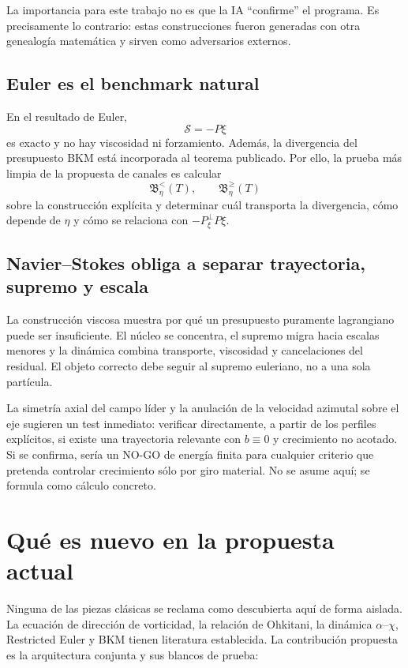 \documentclass[11pt]{article}
\newcommand{\Pperp}{P_{\xi}^{\perp}}
\newcommand{\Scal}{\mathcal S}
\begin{document}
La importancia para este trabajo no es que la IA ``confirme'' el programa. Es precisamente lo contrario: estas construcciones fueron generadas con otra genealogía matemática y sirven como adversarios externos.

\subsection{Euler es el benchmark natural}

En el resultado de Euler,
\[
\Scal=-P\xi
\]
es exacto y no hay viscosidad ni forzamiento. Además, la divergencia del presupuesto BKM está incorporada al teorema publicado. Por ello, la prueba más limpia de la propuesta de canales es calcular
\[
\mathfrak B_\eta^{<}(T),\qquad \mathfrak B_\eta^{\ge}(T)
\]
sobre la construcción explícita y determinar cuál transporta la divergencia, cómo depende de $\eta$ y cómo se relaciona con $-\Pperp P\xi$.

\subsection{Navier--Stokes obliga a separar trayectoria, supremo y escala}

La construcción viscosa muestra por qué un presupuesto puramente lagrangiano puede ser insuficiente. El núcleo se concentra, el supremo migra hacia escalas menores y la dinámica combina transporte, viscosidad y cancelaciones del residual. El objeto correcto debe seguir al supremo euleriano, no a una sola partícula.

La simetría axial del campo líder y la anulación de la velocidad azimutal sobre el eje sugieren un test inmediato: verificar directamente, a partir de los perfiles explícitos, si existe una trayectoria relevante con $b\equiv0$ y crecimiento no acotado. Si se confirma, sería un NO-GO de energía finita para cualquier criterio que pretenda controlar crecimiento sólo por giro material. No se asume aquí; se formula como cálculo concreto.

\section{Qué es nuevo en la propuesta actual}

Ninguna de las piezas clásicas se reclama como descubierta aquí de forma aislada. La ecuación de dirección de vorticidad, la relación de Ohkitani, la dinámica $\alpha$--$\chi$, Restricted Euler y BKM tienen literatura establecida. La contribución propuesta es la arquitectura conjunta y sus blancos de prueba:
\end{document}
